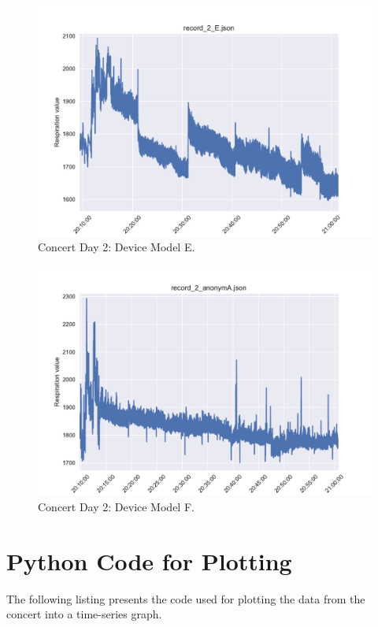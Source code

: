 \begin{figure}
    \centering
    \includegraphics[scale=0.6]{images/record_2_e.pdf}
    \caption{Concert Day 2: Device Model E.}
    \label{fig:concert_day2_e}
\end{figure}

\begin{figure}
    \centering
    \includegraphics[scale=0.6]{images/record_2_f.pdf}
    \caption{Concert Day 2: Device Model F.}
    \label{fig:concert_day2_f}
\end{figure}

\newpage
\section{Python Code for Plotting}
The following listing presents the code used for plotting the data from the concert into a time-series graph. 

